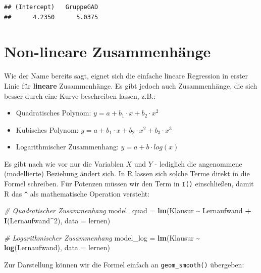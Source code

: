 \documentclass[
]{book}
\newenvironment{Shaded}{\begin{snugshade}}{\end{snugshade}}
\newcommand{\AttributeTok}[1]{\textcolor[rgb]{0.13,0.29,0.53}{#1}}
\newcommand{\CommentTok}[1]{\textcolor[rgb]{0.56,0.35,0.01}{\textit{#1}}}
\newcommand{\DecValTok}[1]{\textcolor[rgb]{0.00,0.00,0.81}{#1}}
\newcommand{\FunctionTok}[1]{\textcolor[rgb]{0.13,0.29,0.53}{\textbf{#1}}}
\newcommand{\NormalTok}[1]{#1}
\newcommand{\OtherTok}[1]{\textcolor[rgb]{0.56,0.35,0.01}{#1}}
\newcommand{\SpecialCharTok}[1]{\textcolor[rgb]{0.81,0.36,0.00}{\textbf{#1}}}
\providecommand{\tightlist}{%
  \setlength{\itemsep}{0pt}\setlength{\parskip}{0pt}}
\begin{document}
\begin{verbatim}
## (Intercept)   GruppeGAD 
##      4.2350      5.0375
\end{verbatim}

\section{Non-lineare Zusammenhänge}\label{non-lineare-zusammenhuxe4nge}

Wie der Name bereits sagt, eignet sich die einfache lineare Regression in erster Linie für \textbf{lineare} Zusammenhänge. Es gibt jedoch auch Zusammenhänge, die sich besser durch eine Kurve beschreiben lassen, z.B.:

\begin{itemize}
\tightlist
\item
  Quadratisches Polynom: \(y = a + b_1 \cdot x + b_2 \cdot x^2\)
\item
  Kubisches Polynom: \(y = a + b_1 \cdot x + b_2 \cdot x^2 + b_3 \cdot x^3\)
\item
  Logarithmischer Zusammenhang: \(y = a + b \cdot log(x)\)
\end{itemize}

Es gibt nach wie vor nur die Variablen \(X\) und \(Y\) - lediglich die angenommene (modellierte) Beziehung ändert sich. In R lassen sich solche Terme direkt in die Formel schreiben. Für Potenzen müssen wir den Term in \texttt{I()} einschließen, damit R das \texttt{\^{}} als mathematische Operation versteht:

\begin{Shaded}
\begin{Highlighting}[]
\CommentTok{\# Quadratischer Zusammenhang}
\NormalTok{model\_quad }\OtherTok{=} \FunctionTok{lm}\NormalTok{(Klausur }\SpecialCharTok{\textasciitilde{}}\NormalTok{ Lernaufwand }\SpecialCharTok{+} \FunctionTok{I}\NormalTok{(Lernaufwand}\SpecialCharTok{\^{}}\DecValTok{2}\NormalTok{), }\AttributeTok{data =}\NormalTok{ lernen)}

\CommentTok{\# Logarithmischer Zusammenhang}
\NormalTok{model\_log }\OtherTok{=} \FunctionTok{lm}\NormalTok{(Klausur }\SpecialCharTok{\textasciitilde{}} \FunctionTok{log}\NormalTok{(Lernaufwand), }\AttributeTok{data =}\NormalTok{ lernen)}
\end{Highlighting}
\end{Shaded}

Zur Darstellung können wir die Formel einfach an \texttt{geom\_smooth()} übergeben:
\end{document}
